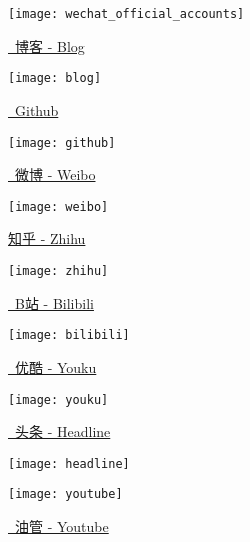 \vspace*{-1.5ex}
\begin{figure}[h!]
    \begin{center}
        \texttt{[image: wechat\_official\_accounts]}
    \end{center}
    \vspace*{-6ex}

    \begin{minipage}[t]{0.22\textwidth}
        \caption*{\href{https://mister-kin.github.io}{\faBook\ 博客 - Blog}}
        \texttt{[image: blog]}
    \end{minipage}
    \quad
    \begin{minipage}[t]{0.22\textwidth}
        \caption*{\href{https://github.com/mister-kin}{\faGithub\ Github}}
        \texttt{[image: github]}
    \end{minipage}
    \quad
    \begin{minipage}[t]{0.22\textwidth}
        \caption*{\href{https://weibo.com/6270111192/profile?topnav=1&wvr=6&is_all=1}{\faWeibo\ 微博 - Weibo}}
        \texttt{[image: weibo]}
    \end{minipage}
    \quad
    \begin{minipage}[t]{0.22\textwidth}
        \caption*{\href{https://www.zhihu.com/people/drwu-94}{知乎 - Zhihu}}
        \texttt{[image: zhihu]}
    \end{minipage}

    \vspace*{1ex}

    \begin{minipage}[t]{0.22\textwidth}
        \caption*{\href{http://space.bilibili.com/17025250?}{\faTv\ B站 - Bilibili}}
        \texttt{[image: bilibili]}
    \end{minipage}
    \quad
    \begin{minipage}[t]{0.22\textwidth}
        \caption*{\href{http://i.youku.com/i/UNjA3MTk5Mjgw?spm=a2hzp.8253869.0.0}{\faChevronCircleRight\ 优酷 - Youku}}
        \texttt{[image: youku]}
    \end{minipage}
    \quad
    \begin{minipage}[t]{0.22\textwidth}
        \caption*{\href{https://www.toutiao.com/c/user/835254071079053/\#mid=1663279303982091}{\faNewspaper[regular]\ 头条 - Headline}}
        \texttt{[image: headline]}
    \end{minipage}
    \quad
    \begin{minipage}[t]{0.22\textwidth}
        \caption*{\href{https://www.youtube.com/channel/UCXqjfWLzMlRKxGC8syWj17Q?view_as=public}{\faYoutube\ 油管 - Youtube}}
        \texttt{[image: youtube]}
    \end{minipage}
\end{figure}
